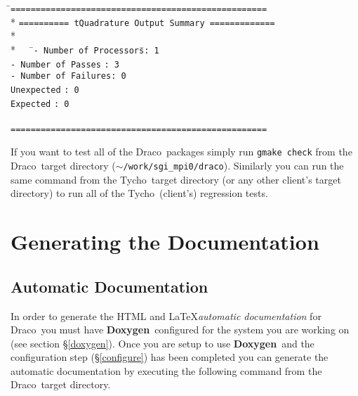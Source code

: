\documentclass[11pt]{nmemo}
\newcommand{\comp}[1]{\normalfont\footnotesize\texttt{#1}\normalsize}
\newcommand{\draco}{{\normalfont\sffamily Draco}}
\newcommand{\tycho}{{\normalfont\sffamily Tycho}}
\newcommand{\doxygen}{{\normalfont\bfseries Doxygen}}
\begin{document}
\footnotesize
\begin{tabbing}
\hspace{0.5in}\=\comp{===================================================}\\*
\+\>\comp{========== tQuadrature Output Summary =============}\\*
\ \\*
\ \ \ \=\comp{- Number of Processors}\hspace{0.5in}\=\comp{:\ 1}\\
\>\comp{- Number of Passes}\>  \comp{:\ 3}\\
\>\comp{- Number of Failures}\>\comp{:\ 0}\\
\>\hspace{0.95in}\comp{Unexpected}\>          \comp{:\ 0}\\
\>\hspace{0.95in}\comp{Expected}\>            \comp{:\ 0}\\
\ \\
\comp{===================================================}

\end{tabbing}
\normalsize

If you want to test all of the \draco\ packages simply run 
\comp{gmake check} from the \draco\ target directory
(\comp{$\sim$/work/sgi\_mpi0/draco}).  Similarly you can run the same
command from the \tycho\ target directory (or any other client's
target directory) to run all of the \tycho\ (client's)
regression tests.


\section{Generating the Documentation}

\subsection{Automatic Documentation}

In order to generate the HTML and \LaTeX \emph{automatic documentation} for
\draco\ you must have \doxygen\ configured for the system you are
working on (see section \S\ref{doxygen}).  Once you are setup to use
\doxygen\ and the configuration step (\S\ref{configure}) has been
completed you can generate the automatic documentation by executing the
following command from the \draco\ target directory.
\end{document}
